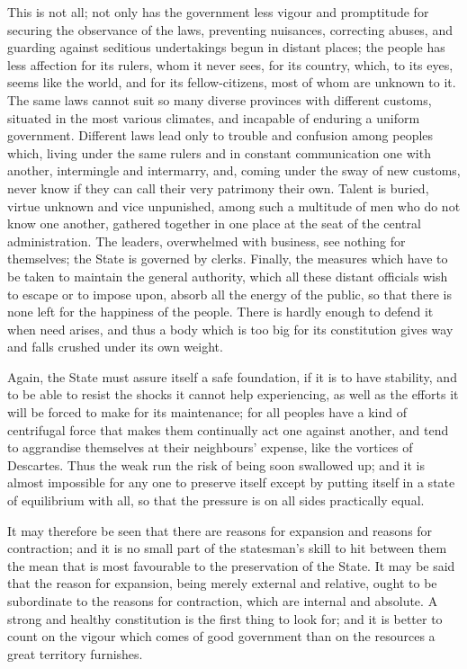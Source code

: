 \documentclass[12pt]{book}
\begin{document}
This is not all; not only has the government less vigour and promptitude for securing the observance of the laws, preventing nuisances, correcting abuses, and guarding against seditious undertakings begun in distant places; the people has less affection for its rulers, whom it never sees, for its country, which, to its eyes, seems like the world, and for its fellow-citizens, most of whom are unknown to it. The same laws cannot suit so many diverse provinces with different customs, situated in the most various climates, and incapable of enduring a uniform government. Different laws lead only to trouble and confusion among peoples which, living under the same rulers and in constant communication one with another, intermingle and intermarry, and, coming under the sway of new customs, never know if they can call their very patrimony their own. Talent is buried, virtue unknown and vice unpunished, among such a multitude of men who do not know one another, gathered together in one place at the seat of the central administration. The leaders, overwhelmed with business, see nothing for themselves; the State is governed by clerks. Finally, the measures which have to be taken to maintain the general authority, which all these distant officials wish to escape or to impose upon, absorb all the energy of the public, so that there is none left for the happiness of the people. There is hardly enough to defend it when need arises, and thus a body which is too big for its constitution gives way and falls crushed under its own weight.

Again, the State must assure itself a safe foundation, if it is to have stability, and to be able to resist the shocks it cannot help experiencing, as well as the efforts it will be forced to make for its maintenance; for all peoples have a kind of centrifugal force that makes them continually act one against another, and tend to aggrandise themselves at their neighbours' expense, like the vortices of Descartes. Thus the weak run the risk of being soon swallowed up; and it is almost impossible for any one to preserve itself except by putting itself in a state of equilibrium with all, so that the pressure is on all sides practically equal.

It may therefore be seen that there are reasons for expansion and reasons for contraction; and it is no small part of the statesman's skill to hit between them the mean that is most favourable to the preservation of the State. It may be said that the reason for expansion, being merely external and relative, ought to be subordinate to the reasons for contraction, which are internal and absolute. A strong and healthy constitution is the first thing to look for; and it is better to count on the vigour which comes of good government than on the resources a great territory furnishes.
\end{document}

